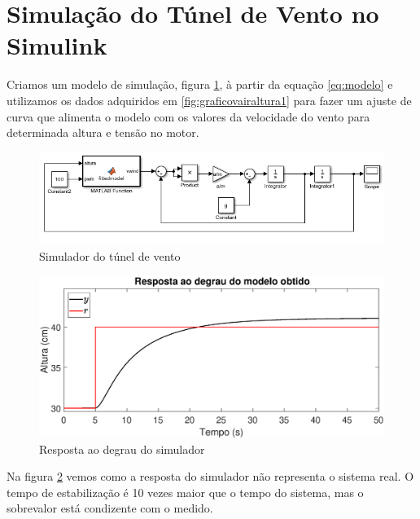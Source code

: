 \section{Simulação do Túnel de Vento no Simulink}

Criamos um modelo de simulação, figura \ref{fig:simulador}, à partir da equação \ref{eq:modelo} e utilizamos os dados adquiridos em \ref{fig:graficovairaltura1} para fazer um ajuste de curva que alimenta o modelo com os valores da velocidade do vento para determinada altura e tensão no motor.

\begin{figure}[htb]
	\centering
	\includegraphics[width=1\linewidth]{simulador}
	\caption[Simulador do túnel de vento]{Simulador do túnel de vento}
	\label{fig:simulador}
\end{figure}

\begin{figure}[htb]
	\centering
	\includegraphics[width=1\linewidth]{pasta1_figuras/step_simul}
	\caption[Resposta ao degrau do simulador]{Resposta ao degrau do simulador}
	\label{fig:stepsimul}
\end{figure}

Na figura \ref{fig:stepsimul} vemos como a resposta do simulador não representa o sistema real. O tempo de estabilização é 10 vezes maior que o tempo do sistema, mas o sobrevalor está condizente com o medido.



